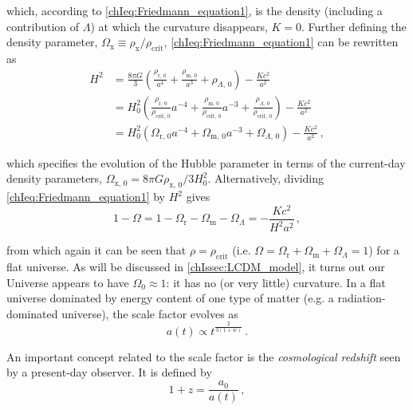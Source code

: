 \noindent which, according to \cref{chIeq:Friedmann_equation1}, is the density (including a contribution of $\Lambda$) at which the curvature disappears, $K = 0$. Further defining the density parameter, $\Omega_\text{x} \equiv \rho_\text{x} / \rho_\text{crit}$, \cref{chIeq:Friedmann_equation1} can be rewritten as
\begin{align}
    \label{chIeq:Friedmann_equation1_alt1}
    H^2 & = \frac{8 \pi G}{3} \left( \frac{\rho_{\text{r}, \, 0}}{a^4} + \frac{\rho_{\text{m}, \, 0}}{a^3} + \rho_{\Lambda, \, 0} \right) - \frac{K c^2}{a^2} \nonumber
    \\
    & = H_0^2 \left( \frac{\rho_{\text{r}, \, 0}}{\rho_{\text{crit}, \, 0}} a^{-4} + \frac{\rho_{\text{m}, \, 0}}{\rho_{\text{crit}, \, 0}} a^{-3} + \frac{\rho_{\Lambda, \, 0}}{\rho_{\text{crit}, \, 0}} \right) - \frac{K c^2}{a^2} \nonumber
    \\
    & = H_0^2 \left( \Omega_{\text{r}, \, 0} a^{-4} + \Omega_{\text{m}, \, 0} a^{-3} + \Omega_{\Lambda, \, 0} \right) - \frac{K c^2}{a^2} \, ,
\end{align}

\noindent which specifies the evolution of the Hubble parameter in terms of the current-day density parameters, $\Omega_{\text{x}, \, 0} = 8 \pi G \rho_{\text{x}, \, 0} / 3 H_0^2$. Alternatively, dividing \cref{chIeq:Friedmann_equation1} by $H^2$ gives
\begin{equation}
    \label{chIeq:Friedmann_equation1_alt2}
    1 - \Omega = 1 - \Omega_\text{r} - \Omega_\text{m} - \Omega_\Lambda = - \frac{K c^2}{H^2 a^2} \, ,
\end{equation}

\noindent from which again it can be seen that $\rho = \rho_\text{crit}$ (i.e. $\Omega = \Omega_\text{r} + \Omega_\text{m} + \Omega_\Lambda = 1$) for a flat universe. As will be discussed in \cref{chIssec:LCDM_model}, it turns out our Universe appears to have $\Omega_0 \approx 1$: it has no (or very little) curvature. In a flat universe dominated by energy content of one type of matter (e.g. a radiation-dominated universe), the scale factor evolves as
\begin{equation}
    \label{chIeq:Scale_factor}
    a(t) \propto t^\frac{2}{3(1+w)} \, .
\end{equation}

An important concept related to the scale factor is the \textit{cosmological redshift} seen by a present-day observer. It is defined by
\begin{equation}
    \label{chIeq:Redshift}
    1 + z = \frac{a_0}{a(t)} \, ,
\end{equation}

